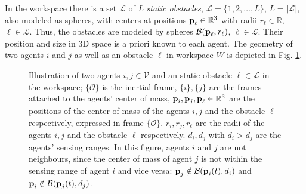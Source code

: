 In the workspace there is a set $\mathcal{L}$ of $L$ \textit{static obstacles},
$\mathcal{L} = \{1, 2, \dots, L\}$,
$L = |\mathcal{L}|$, also modeled as spheres, with centers at positions
$\bm{\mathbf{p}}_{\ell} \in \mathbb{R}^3$ with radii
$r_{\ell}\in \mathbb{R}$, $\ell \in \mathcal{L}$. Thus, the obstacles are
modeled by spheres
$\mathcal{B}(\bm{\mathbf{p}}_{\ell}, r_{\ell})$, $\ell \in \mathcal{L}$.
Their position and size in 3D space is a priori known to each agent.
The geometry of two agents $i$ and $j$ as well as an obstacle
$\ell$ in workspace $W$ is depicted in Fig. \ref{fig:two_agents_one_obstacle}.\\

\begin{figure}[ht!]
	\centering
    
    \caption{Illustration of two agents $i, j \in \mathcal{V}$ and an static
      obstacle $\ell \in \mathcal{L}$ in the workspace; $\{\mathcal{O}\}$ is the inertial
      frame, $\{i\}, \{j\}$ are the frames attached to the agents' center of
      mass, $\bm{\mathbf{p}}_i, \bm{\mathbf{p}}_j, \bm{\mathbf{p}}_{\ell} \in \mathbb{R}^3$ are the
      positions of the center of mass of the agents $i,j$ and the
      obstacle $\ell$ respectively, expressed in frame
      $\{\mathcal{O}\}$. $r_i, r_j, r_{\ell}$ are the radii of the agents $i,j$
      and the obstacle $\ell$ respectively. $d_i, d_j$ with
      $d_i > d_j$ are the agents' sensing ranges.
      In this figure, agents $i$ and $j$ are not neighbours, since the center
      of mass of agent $j$ is not within the sensing range of agent $i$ and vice
      versa: $\bm{\mathbf{p}}_j \notin \mathcal{B}(\bm{\mathbf{p}}_i(t), d_i)$ and
      $\bm{\mathbf{p}}_i \notin \mathcal{B}(\bm{\mathbf{p}}_j(t), d_j)$.}
	\label{fig:two_agents_one_obstacle}
\end{figure}

